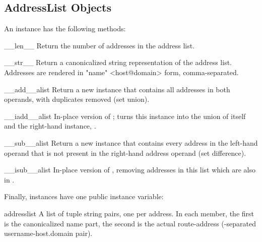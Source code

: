 \subsection{AddressList Objects \label{addresslist-objects}}

An  instance has the following methods:

\begin{methoddesc}{__len__}{}
Return the number of addresses in the address list.
\end{methoddesc}

\begin{methoddesc}{__str__}{}
Return a canonicalized string representation of the address list.
Addresses are rendered in "name" <host@domain> form, comma-separated.
\end{methoddesc}

\begin{methoddesc}{__add__}{alist}
Return a new  instance that contains all addresses
in both  operands, with duplicates removed (set
union).
\end{methoddesc}

\begin{methoddesc}{__iadd__}{alist}
In-place version of ; turns this 
instance into the union of itself and the right-hand instance,
.
\end{methoddesc}

\begin{methoddesc}{__sub__}{alist}
Return a new  instance that contains every address
in the left-hand  operand that is not present in
the right-hand address operand (set difference).
\end{methoddesc}

\begin{methoddesc}{__isub__}{alist}
In-place version of , removing addresses in this
list which are also in .
\end{methoddesc}


Finally,  instances have one public instance variable:

\begin{memberdesc}{addresslist}
A list of tuple string pairs, one per address.  In each member, the
first is the canonicalized name part, the second is the
actual route-address (-separated username-host.domain
pair).
\end{memberdesc}
